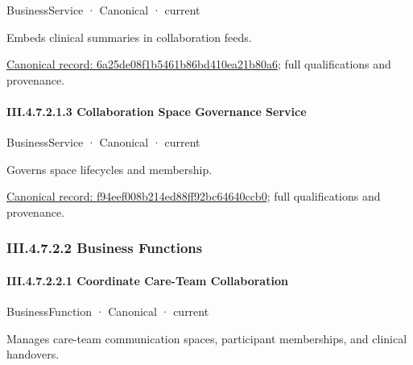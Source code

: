 \label{element:6a25de08f1b5461b86bd410ea21b80a6}
{\small BusinessService · Canonical · current}\par

Embeds clinical summaries in collaboration feeds.


{\footnotesize \href{../../../../continuum/business/business-service/6a25de08f1b5461b86bd410ea21b80a6.md}{Canonical record: 6a25de08f1b5461b86bd410ea21b80a6}; full qualifications and provenance.}\par
\paragraph*{III.4.7.2.1.3 Collaboration Space Governance Service}
\label{navigation:III.4.7.2.1.3}

\label{element:f94eef008b214ed88ff92bc64640ccb0}
{\small BusinessService · Canonical · current}\par

Governs space lifecycles and membership.


{\footnotesize \href{../../../../continuum/business/business-service/f94eef008b214ed88ff92bc64640ccb0.md}{Canonical record: f94eef008b214ed88ff92bc64640ccb0}; full qualifications and provenance.}\par
\subsubsection*{III.4.7.2.2 Business Functions}
\label{navigation:III.4.7.2.2}

\paragraph*{III.4.7.2.2.1 Coordinate Care-Team Collaboration}
\label{navigation:III.4.7.2.2.1}

\label{element:5443b253f0e4425f984702d396e77a3d}
{\small BusinessFunction · Canonical · current}\par

Manages care-team communication spaces, participant memberships, and clinical handovers.




